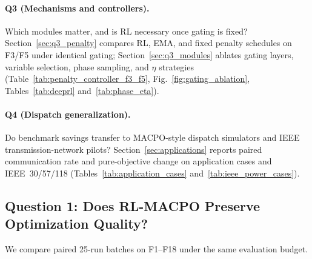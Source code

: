 \documentclass[conference]{IEEEtran}
\begin{document}
\paragraph{Q3 (Mechanisms and controllers).}
Which modules matter, and is RL necessary once gating is fixed? Section~\ref{sec:q3_penalty} compares RL, EMA, and fixed penalty schedules on F3/F5 under identical gating; Section~\ref{sec:q3_modules} ablates gating layers, variable selection, phase sampling, and $\eta$ strategies (Table~\ref{tab:penalty_controller_f3_f5}, Fig.~\ref{fig:gating_ablation}, Tables~\ref{tab:deeprl} and~\ref{tab:phase_eta}).

\paragraph{Q4 (Dispatch generalization).}
Do benchmark savings transfer to MACPO-style dispatch simulators and IEEE transmission-network pilots? Section~\ref{sec:applications} reports paired communication rate and pure-objective change on application cases and IEEE~30/57/118 (Tables~\ref{tab:application_cases} and~\ref{tab:ieee_power_cases}).

\subsection{Question 1: Does RL-MACPO Preserve Optimization Quality?}\label{sec:exp_q1}
We compare paired 25-run batches on F1--F18 under the same evaluation budget.
\end{document}
